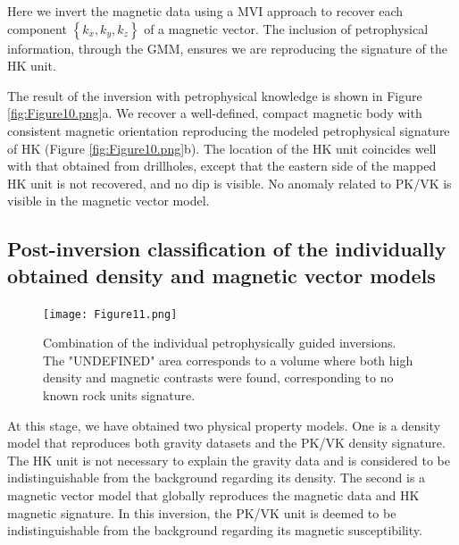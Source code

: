 \documentclass[paper, twocolumn]{geophysics} %
\begin{document}
Here we invert the magnetic data using a MVI approach to recover each component $\left\{k_x,k_y,k_z\right\}$ of a magnetic vector. The inclusion of petrophysical information, through the GMM, ensures we are reproducing the signature of the HK unit.

The result of the inversion with petrophysical knowledge is shown in Figure \ref{fig:Figure10.png}a. We recover a well-defined, compact magnetic body with consistent magnetic orientation reproducing the modeled petrophysical signature of HK (Figure \ref{fig:Figure10.png}b). The location of the HK unit coincides well with that obtained from drillholes, except that the eastern side of the mapped HK unit is not recovered, and no dip is visible. No anomaly related to PK/VK is visible in the magnetic vector model.

\subsection{Post-inversion classification of the individually obtained density and magnetic vector models}



\begin{figure}
\centering
\texttt{[image: Figure11.png]}
\caption{Combination of the individual petrophysically guided inversions. The "UNDEFINED" area corresponds to a volume where both high density and magnetic contrasts were found, corresponding to no known rock units signature.}
\label{fig:Figure11.png}
\end{figure}

At this stage, we have obtained two physical property models.
One is a density model that reproduces both gravity datasets and the PK/VK density signature. The HK unit is not necessary to explain the gravity data and is considered to be indistinguishable from the background regarding its density.
The second is a magnetic vector model that globally reproduces the magnetic data and HK magnetic signature. In this inversion, the PK/VK unit is deemed to be indistinguishable from the background regarding its magnetic susceptibility.
\end{document}
